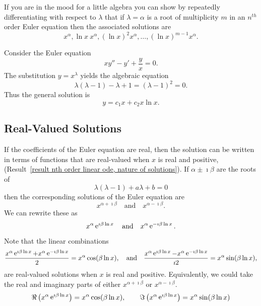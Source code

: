 If you are in the mood for a little algebra you can show 
by repeatedly differentiating with respect to $\lambda$ that if 
$\lambda = \alpha$ is a root of multiplicity $m$ in an $n^{t h}$ order Euler
equation then the associated solutions are
\[ 
x^\alpha, \ln x\ x^\alpha, (\ln x)^2 x^\alpha, \ldots, (\ln x)^{m-1} x^\alpha. 
\]


\begin{Example}
  Consider the Euler equation
  \[
  x y'' - y' + \frac{y}{x} = 0.
  \]
  The substitution $y = x^\lambda$ yields the algebraic equation
  \[ 
  \lambda(\lambda-1) - \lambda + 1 = (\lambda-1)^2 = 0.
  \]
  Thus the general solution is
  \[ 
  \boxed{
    y = c_1 x + c_2 x \ln x.
    }
  \]
\end{Example}






\subsection{Real-Valued Solutions}



If the coefficients of the Euler equation are real, then the solution
can be written in terms of functions that are real-valued when $x$ is
real and positive,
(Result~\ref{result nth order linear ode, nature of solutions}).   
If $\alpha \pm \imath \beta$ are the roots of
\[
\lambda(\lambda-1) + a \lambda + b = 0
\]
then the corresponding solutions of the Euler equation are
\[
x^{\alpha + \imath \beta} \quad \mathrm{and} \quad x^{\alpha - \imath \beta}.
\]
We can rewrite these as
\[
x^\alpha \mathop{\mathrm{e}}\nolimits^{\imath \beta \ln x} \quad \mathrm{and} \quad
x^\alpha \mathop{\mathrm{e}}\nolimits^{-\imath \beta \ln x}.
\]
Note that the linear combinations
\[
\frac{x^\alpha \mathop{\mathrm{e}}\nolimits^{\imath \beta \ln x} + x^\alpha \mathop{\mathrm{e}}\nolimits^{-\imath \beta \ln x}}{2}
= x^\alpha \cos(\beta \ln x), 
\quad \mathrm{and} \quad
\frac{x^\alpha \mathop{\mathrm{e}}\nolimits^{\imath \beta \ln x} - x^\alpha \mathop{\mathrm{e}}\nolimits^{-\imath \beta \ln x}}{\imath 2}
= x^\alpha \sin(\beta \ln x), 
\]
are real-valued solutions when $x$ is real and positive.
Equivalently, we could take the real and imaginary parts of either
$x^{\alpha + \imath \beta}$ or $x^{\alpha - \imath \beta}$.
\[
\Re \left( x^\alpha \mathop{\mathrm{e}}\nolimits^{\imath \beta \ln x} \right) = x^\alpha \cos(\beta \ln x), \qquad
\Im \left( x^\alpha \mathop{\mathrm{e}}\nolimits^{\imath \beta \ln x} \right) = x^\alpha \sin(\beta \ln x)
\]





